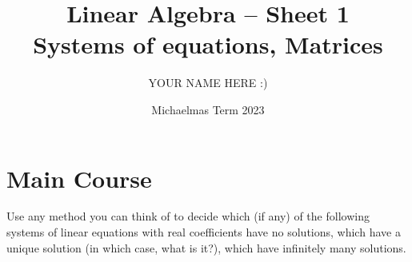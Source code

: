 \documentclass[answers]{exam}
\title{Linear Algebra -- Sheet 1\\Systems of equations, Matrices}
\author{YOUR NAME HERE :)}
\date{Michaelmas Term 2023}
\newcommand*{\bump}{\vspace{1em}\phantom{}\vspace{-1.75em}}
\begin{document}
\maketitle
\section*{Main Course}
\begin{questions}

\question%
Use any method you can think of to decide which (if any) of the following systems of linear equations with real coefficients have no solutions, which have a unique solution (in which case, what is it?), which have infinitely many solutions.
\begin{parts}
\part%
\bump \[
	\left\{\begin{aligned}
		2x+4y-3z&=0\\
		x-4y+3z&=0\\
		3x-5y+2z&=1
	\end{aligned}\right.;
\]

\part%
\bump \[
	\left\{\begin{aligned}
		x+2y+3z& =0 \\
		2 x+3 y+4 z & =1 \\
		3 x+4 y+5 z & =2
	\end{aligned}\right.;
\]

\part%
\bump \[
	\left\{\begin{aligned}
		x+2 y+3 z & =0 \\
		2 x+3 y+4 z & =2 \\
		3 x+4 y+5 z & =2
	\end{aligned}\right..
\]
\end{parts}




\end{questions}
\end{document}
